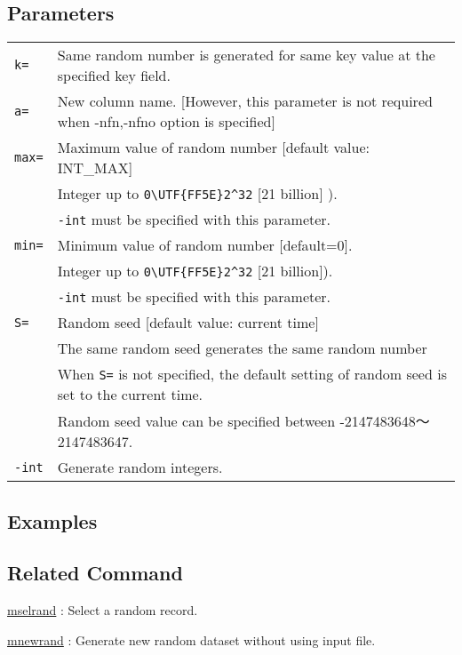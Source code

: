 \subsection*{Parameters}
\begin{table}[htbp]
{\small
\begin{tabular}{ll}
\verb|k=|    & Same random number is generated for same key value at the specified key field.  \\

\verb|a=|    & New column name. [However, this parameter is not required when -nfn,-nfno option is specified]\\
\verb|max=|  & Maximum value of random number [default value: INT\_MAX]\\
             & Integer up to \verb|0\UTF{FF5E}2^32| [21 billion] ). \\
             & \verb|-int| must be specified with this parameter. \\
\verb|min=|  & Minimum value of random number [default=0]. \\
             & Integer up to \verb|0\UTF{FF5E}2^32| [21 billion]). \\
               & \verb|-int| must be specified with this parameter. \\
\verb|S=|    & Random seed [default value: current time]\\
             & The same random seed generates the same random number \\
             & When  \verb|S=| is not specified, the default setting of random seed is set to the current time. \\
             & Random seed value can be specified between -2147483648〜2147483647. \\
\verb|-int|  & Generate random integers.\\
\end{tabular} 
}
\end{table} 



\subsection*{Examples}


\subsection*{Related Command}
\hyperref[sect:mselrand] {mselrand} : Select a random record. 

\hyperref[sect:mnewrand] {mnewrand} : Generate new random dataset without using input file. 

%
